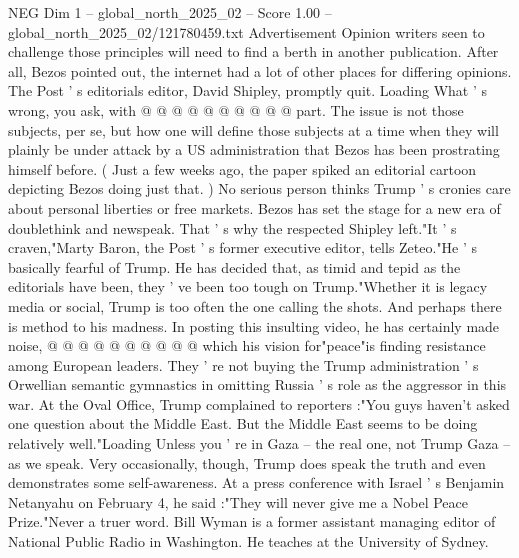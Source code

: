 \begin{textsample}{NEG Dim 1 – global\_north\_2025\_02 – Score 1.00 – global\_north\_2025\_02/121780459.txt}
Advertisement Opinion writers seen to challenge those principles will need to find a berth in another publication.
After all, Bezos pointed out, the internet had a lot of other places for differing opinions.
The Post ' s editorials editor, David Shipley, promptly quit.
Loading What ' s wrong, you ask, with @ @ @ @ @ @ @ @ @ @ part.
The issue is not those subjects, per se, but how one will define those subjects at a time when they will plainly be under attack by a US administration that Bezos has been prostrating himself before. ( Just a few weeks ago, the paper spiked an editorial cartoon depicting Bezos doing just that. ) No serious person thinks Trump ' s cronies care about personal liberties or free markets.
Bezos has set the stage for a new era of doublethink and newspeak.
That ' s why the respected Shipley left."It ' s craven,"Marty Baron, the Post ' s former executive editor, tells Zeteo."He ' s basically fearful of Trump.
He has decided that, as timid and tepid as the editorials have been, they ' ve been too tough on Trump."Whether it is legacy media or social, Trump is too often the one calling the shots.
And perhaps there is method to his madness.
In posting this insulting video, he has certainly made noise, @ @ @ @ @ @ @ @ @ @ which his vision for"peace"is finding resistance among European leaders.
They ' re not buying the Trump administration ' s Orwellian semantic gymnastics in omitting Russia ' s role as the aggressor in this war.
At the Oval Office, Trump complained to reporters :"You guys haven't asked one question about the Middle East.
But the Middle East seems to be doing relatively well."Loading Unless you ' re in Gaza -- the real one, not Trump Gaza -- as we speak.
Very occasionally, though, Trump does speak the truth and even demonstrates some self-awareness.
At a press conference with Israel ' s Benjamin Netanyahu on February 4, he said :"They will never give me a Nobel Peace Prize."Never a truer word.
Bill Wyman is a former assistant managing editor of National Public Radio in Washington.
He teaches at the University of Sydney.

\end{textsample}
